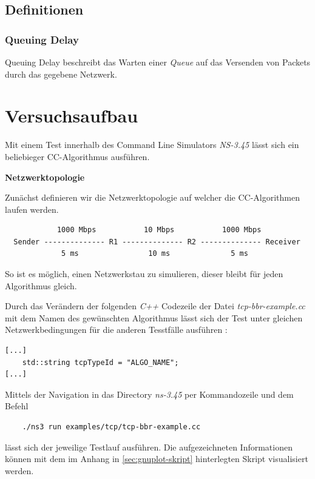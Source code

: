 \documentclass[paper=a4,fontsize=12pt,ngerman]{scrartcl}
\begin{document}
\subsection{Definitionen}

\subsubsection{Queuing Delay}
Queuing Delay beschreibt das Warten einer \textit{Queue}
auf das Versenden von Packets durch das gegebene Netzwerk.

\clearpage
\section{Versuchsaufbau}

Mit einem Test innerhalb des Command Line Simulators \textit{NS-3.45} lässt sich ein beliebieger CC-Algorithmus ausführen.


\textbf{Netzwerktopologie}

Zunächst definieren wir die Netzwerktopologie auf welcher die CC-Algorithmen
laufen werden.\cite{ns3BBR}
\small
\begin{verbatim}
            1000 Mbps           10 Mbps           1000 Mbps
  Sender -------------- R1 -------------- R2 -------------- Receiver
             5 ms                10 ms              5 ms
\end{verbatim}
So ist es möglich, einen Netzwerkstau zu simulieren, dieser bleibt für jeden Algorithmus gleich.

Durch das Verändern der folgenden \textit{C++} Codezeile der Datei \textit{tcp-bbr-example.cc} mit dem Namen des gewünschten Algorithmus lässt sich der Test unter gleichen Netzwerkbedingungen für die anderen Tesstfälle ausführen :

\small
\begin{verbatim}
[...]
    std::string tcpTypeId = "ALGO_NAME";     
[...]
\end{verbatim}
Mittels der Navigation in das Directory \textit{ns-3.45} per Kommandozeile und dem Befehl
\small
\begin{verbatim}
    ./ns3 run examples/tcp/tcp-bbr-example.cc
\end{verbatim}
lässt sich der jeweilige Testlauf ausführen.
 Die aufgezeichneten Informationen können mit dem im Anhang 
 in \ref{sec:gnuplot-skript} hinterlegten Skript visualisiert werden.
\end{document}

